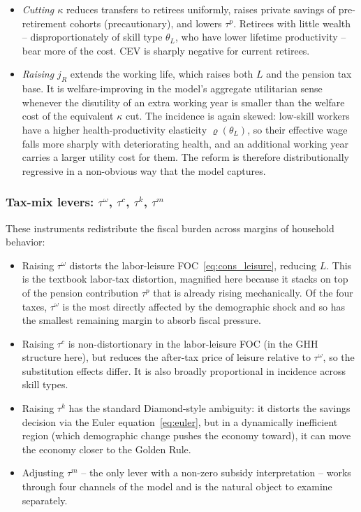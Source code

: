 \documentclass[12pt,a4paper]{article}
\begin{document}
\begin{itemize}
\item \emph{Cutting $\kappa$} reduces transfers to retirees uniformly, raises private savings of pre-retirement cohorts (precautionary), and lowers $\tau^p$. Retirees with little wealth -- disproportionately of skill type $\theta_L$, who have lower lifetime productivity -- bear more of the cost. CEV is sharply negative for current retirees.
\item \emph{Raising $j_R$} extends the working life, which raises both $L$ and the pension tax base. It is welfare-improving in the model's aggregate utilitarian sense whenever the disutility of an extra working year is smaller than the welfare cost of the equivalent $\kappa$ cut. The incidence is again skewed: low-skill workers have a higher health-productivity elasticity $\varrho(\theta_L)$, so their effective wage falls more sharply with deteriorating health, and an additional working year carries a larger utility cost for them. The reform is therefore distributionally regressive in a non-obvious way that the model captures.
\end{itemize}
 
\subsubsection{Tax-mix levers: $\tau^\omega$, $\tau^c$, $\tau^k$, $\tau^m$}
 
These instruments redistribute the fiscal burden across margins of household behavior:
 
\begin{itemize}
\item Raising $\tau^\omega$ distorts the labor-leisure FOC~\eqref{eq:cons_leisure}, reducing $L$. This is the textbook labor-tax distortion, magnified here because it stacks on top of the pension contribution $\tau^p$ that is already rising mechanically. Of the four taxes, $\tau^\omega$ is the most directly affected by the demographic shock and so has the smallest remaining margin to absorb fiscal pressure.
\item Raising $\tau^c$ is non-distortionary in the labor-leisure FOC (in the GHH structure here), but reduces the after-tax price of leisure relative to $\tau^\omega$, so the substitution effects differ. It is also broadly proportional in incidence across skill types.
\item Raising $\tau^k$ has the standard Diamond-style ambiguity: it distorts the savings decision via the Euler equation~\eqref{eq:euler}, but in a dynamically inefficient region (which demographic change pushes the economy toward), it can move the economy closer to the Golden Rule.
\item Adjusting $\tau^m$ -- the only lever with a non-zero subsidy interpretation -- works through four channels of the model and is the natural object to examine separately.
\end{itemize}
 
\end{document}
